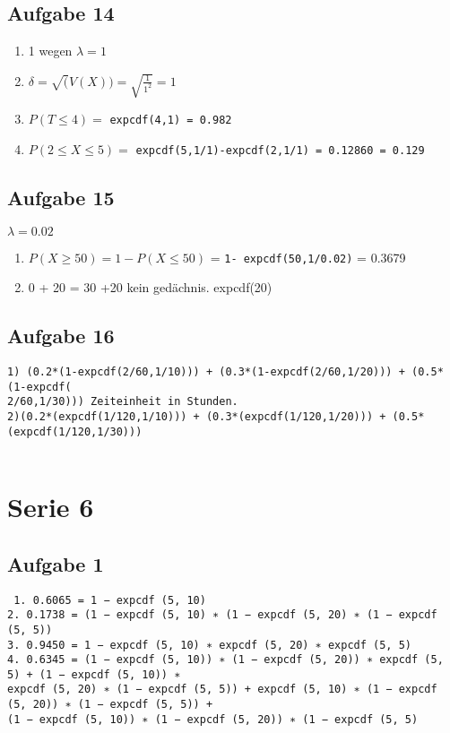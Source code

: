 \documentclass[a4paper,10pt]{scrbook}
\begin{document}
\section*{Aufgabe 14}
\begin{enumerate}
 \item 1 wegen $ \lambda = 1$
 \item  $\delta = \sqrt(V(X)) = \sqrt{\frac{1}{1^2}} = 1$
 \item $P(T \leq 4) = $ \texttt{expcdf(4,1) = 0.982}
 \item $ P(2 \leq X \leq 5) = $ \texttt{expcdf(5,1/1)-expcdf(2,1/1) = 0.12860 = 0.129}
\end{enumerate}

\section*{Aufgabe 15}
$\lambda =  0.02$ \\
\begin{enumerate}
 \item $ P( X \geq 50) = 1-P(X \leq 50) $ = \texttt{1- expcdf(50,1/0.02)} = 0.3679
\item 0 + 20 = 30 +20 kein gedächnis. expcdf(20)	
\end{enumerate}

\section*{Aufgabe 16}
\begin{verbatim}
1) (0.2*(1-expcdf(2/60,1/10))) + (0.3*(1-expcdf(2/60,1/20))) + (0.5*(1-expcdf(
2/60,1/30))) Zeiteinheit in Stunden.
2)(0.2*(expcdf(1/120,1/10))) + (0.3*(expcdf(1/120,1/20))) + (0.5*(expcdf(1/120,1/30)))
 
\end{verbatim}

\chapter*{Serie 6}
\section*{Aufgabe 1}
\begin{verbatim}
 1. 0.6065 = 1 − expcdf (5, 10)
2. 0.1738 = (1 − expcdf (5, 10) ∗ (1 − expcdf (5, 20) ∗ (1 − expcdf (5, 5))
3. 0.9450 = 1 − expcdf (5, 10) ∗ expcdf (5, 20) ∗ expcdf (5, 5)
4. 0.6345 = (1 − expcdf (5, 10)) ∗ (1 − expcdf (5, 20)) ∗ expcdf (5, 5) + (1 − expcdf (5, 10)) ∗
expcdf (5, 20) ∗ (1 − expcdf (5, 5)) + expcdf (5, 10) ∗ (1 − expcdf (5, 20)) ∗ (1 − expcdf (5, 5)) +
(1 − expcdf (5, 10)) ∗ (1 − expcdf (5, 20)) ∗ (1 − expcdf (5, 5)
\end{verbatim}
\end{document}
